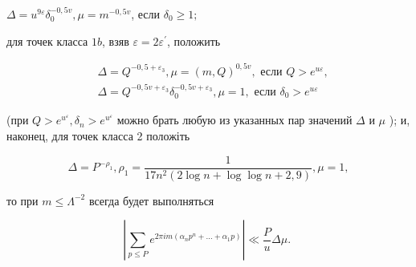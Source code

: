 \documentclass[10pt]{article}
\begin{document}
$\Delta=u^{9 \varepsilon} \delta_{0}^{-0,5 v}, \mu=m^{-0,5 v}$, если $\delta_{0} \geqslant 1 ;$



для точек класса $1 b$, взяв $\varepsilon=2 \varepsilon^{\prime}$, положить



\[

\begin{aligned}

& \Delta=Q^{-0,5+\varepsilon_{3}}, \mu=(m, Q)^{0,5 v}, \text { если } Q>e^{u \varepsilon}, \\

& \Delta=Q^{-0,5 v+\varepsilon_{3}} \delta_{0}^{-0,5 v+\varepsilon_{3}}, \mu=1, \text { если } \delta_{0}>e^{u \varepsilon}

\end{aligned}

\]



(при $Q>e^{u^{\varepsilon}}, \delta_{n}>e^{u^{\varepsilon}}$ можно брать любую из указанных пар значений $\Delta$ и $\mu$ ); и, наконец, для точек класса 2 положіть



\[

\Delta=P^{-\rho_{1}}, \rho_{1}=\frac{1}{17 n^{2}(2 \log n+\log \log n+2,9)}, \mu=1,

\]



то при $m \leqslant \Lambda^{-2}$ всегда будет выполняться



\[

\left|\sum_{p \leqslant P} e^{2 \pi i m\left(\alpha_{n} p^{n}+\ldots+\alpha_{1} p\right)}\right| \ll \frac{P}{u} \Delta \mu \text {. }

\]
\end{document}
